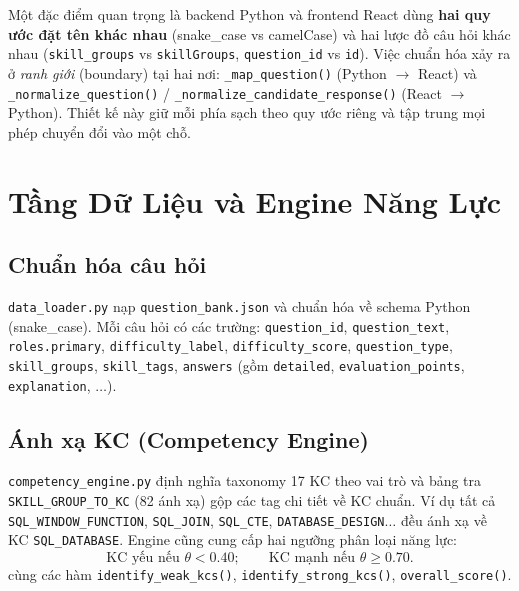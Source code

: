 Một đặc điểm quan trọng là backend Python và frontend React dùng \textbf{hai quy ước đặt tên khác nhau} (snake\_case vs camelCase) và hai lược đồ câu hỏi khác nhau (\texttt{skill\_groups} vs \texttt{skillGroups}, \texttt{question\_id} vs \texttt{id}). Việc chuẩn hóa xảy ra ở \textit{ranh giới} (boundary) tại hai nơi: \texttt{\_map\_question()} (Python $\to$ React) và \texttt{\_normalize\_question()} / \texttt{\_normalize\_candidate\_response()} (React $\to$ Python). Thiết kế này giữ mỗi phía sạch theo quy ước riêng và tập trung mọi phép chuyển đổi vào một chỗ.

\section{Tầng Dữ Liệu và Engine Năng Lực}
\label{sec:data_layer}

\subsection{Chuẩn hóa câu hỏi}
\texttt{data\_loader.py} nạp \texttt{question\_bank.json} và chuẩn hóa về schema Python (snake\_case). Mỗi câu hỏi có các trường: \texttt{question\_id}, \texttt{question\_text}, \texttt{roles.primary}, \texttt{difficulty\_label}, \texttt{difficulty\_score}, \texttt{question\_type}, \texttt{skill\_groups}, \texttt{skill\_tags}, \texttt{answers} (gồm \texttt{detailed}, \texttt{evaluation\_points}, \texttt{explanation}, $\ldots$).

\subsection{Ánh xạ KC (Competency Engine)}
\texttt{competency\_engine.py} định nghĩa taxonomy 17 KC theo vai trò và bảng tra \texttt{SKILL\_GROUP\_TO\_KC} (82 ánh xạ) gộp các tag chi tiết về KC chuẩn. Ví dụ tất cả \texttt{SQL\_WINDOW\_FUNCTION}, \texttt{SQL\_JOIN}, \texttt{SQL\_CTE}, \texttt{DATABASE\_DESIGN}$\ldots$ đều ánh xạ về KC \texttt{SQL\_DATABASE}. Engine cũng cung cấp hai ngưỡng phân loại năng lực:
\begin{equation}
  \text{KC yếu nếu } \theta < 0.40; \qquad \text{KC mạnh nếu } \theta \geq 0.70 .
\end{equation}
cùng các hàm \texttt{identify\_weak\_kcs()}, \texttt{identify\_strong\_kcs()}, \texttt{overall\_score()}.

